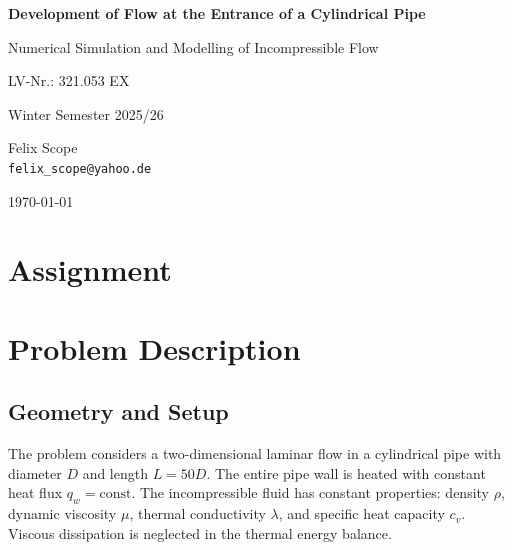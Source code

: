 \documentclass[12pt,a4paper]{article}
\begin{document}
\begin{titlepage}
    \centering
    \vspace*{2cm}

    {\Huge\bfseries Development of Flow at the Entrance of a Cylindrical Pipe\par}

    \vspace{1.5cm}

    {\Large Numerical Simulation and Modelling of Incompressible Flow\par}

    \vspace{1cm}

    {\large LV-Nr.: 321.053 EX\par}
    {\large Winter Semester 2025/26\par}

    \vfill

    {\Large
    Felix Scope\\
    \texttt{felix\_scope@yahoo.de}\\
    }

    \vfill

    {\large \today\par}
\end{titlepage}

\tableofcontents
\newpage

\section*{Assignment}


\newpage

\section{Problem Description}

\subsection{Geometry and Setup}

The problem considers a two-dimensional laminar flow in a cylindrical pipe with diameter $D$ and length $L = 50D$. The entire pipe wall is heated with constant heat flux $q_w = \text{const.}$ The incompressible fluid has constant properties: density $\rho$, dynamic viscosity $\mu$, thermal conductivity $\lambda$, and specific heat capacity $c_v$. Viscous dissipation is neglected in the thermal energy balance.
\end{document}
